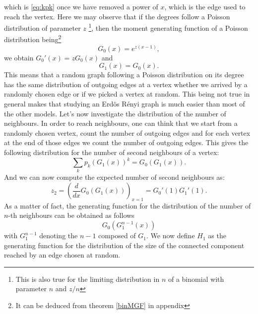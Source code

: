 which is \eqref{eq:kpk} once we have removed a power of $x$, which is the edge used to reach the vertex.
Here we may observe that if the degrees follow a Poisson distribution of parameter $z$
\footnote{This is also true for the limiting distribution in $n$ of a binomial with parameter $n$ and $z/n$},
then the moment generating function of a Poisson distribution being\footnote{It can be deduced from theorem \ref{binMGF} in appendix}
\begin{equation}
	G_0(x) = e^{z(x-1)},
\end{equation}
we obtain $G_0'(x) = zG_0(x)$ and
\begin{equation}\label{eq:PoiGen}
	G_1(x) = G_0(x).
\end{equation}
This means that a random graph following a Poisson distribution on its degree has the same distribution of outgoing edges at a vertex whether we arrived by a randomly chosen edge or if we picked a vertex at random.
This being not true in general makes that studying an Erd\"os R\'enyi graph is much easier than most of the other models.
\newline
Let's now investigate the distribution of the number of neighbours.
In order to reach neighbours, one can think that we start from a randomly chosen vertex, count the number of outgoing edges and for each vertex at the end of those edges we count the number of outgoing edges.
This gives the following distribution for the number of second neighbours of a vertex:
\begin{equation}
	\sum_k p_k(G_1(x))^k = G_0(G_1(x)).
\end{equation}
And we can now compute the expected number of second neighbours as:
\begin{equation}
	z_2 = (\frac{d}{dx} G_0(G_1(x)))_{x=1} = G_0'(1)G_1'(1).
\end{equation}
As a matter of fact, the generating function for the distribution of the number of $n$-th neighbours can be obtained as follows
\begin{equation}
	G_0(G_1^{n-1}(x))
\end{equation}
with $G_1^{n-1}$ denoting the $n-1$ composed of $G_1$.
\newline
We now define $H_1$ as the generating function for the distribution of the size of the connected component reached by an edge chosen at random.
